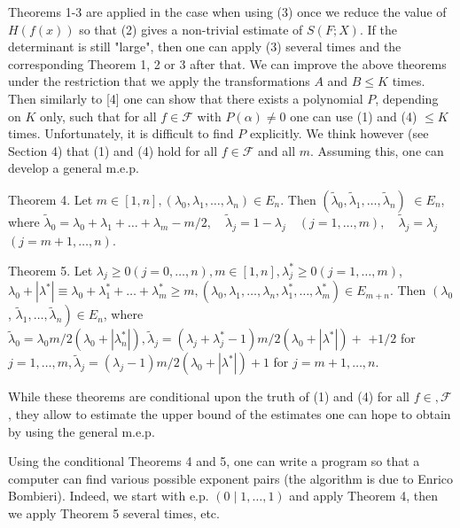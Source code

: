 \documentclass[10pt]{article}
\begin{document}
Theorems 1-3 are applied in the case when using (3) once we reduce the value of $H(f(x))$ so that (2) gives a non-trivial estimate of $S(F ; X)$. If the determinant is still "large", then one can apply (3) several times and the corresponding Theorem 1, 2 or 3 after that. We can improve the above theorems under the restriction that we apply the transformations $A$ and $B \leqslant K$ times. Then similarly to [4] one can show that there exists a polynomial $P$, depending on $K$ only, such that for all $f \in \mathscr{F}$ with $P(\alpha) \neq 0$ one can use (1) and (4) $\leqslant K$ times. Unfortunately, it is difficult to find $P$ explicitly. We think however (see Section 4) that (1) and (4) hold for all $f \in \mathscr{F}$ and all $m$. Assuming this, one can develop a general m.e.p.

Theorem 4. Let $m \in[1, n],\left(\lambda_{0}, \lambda_{1}, \ldots, \lambda_{n}\right) \in E_{n}$. Then $\left(\tilde{\lambda}_{0}, \tilde{\lambda}_{1}, \ldots, \tilde{\lambda}_{n}\right)$ $\in E_{n}$, where $\tilde{\lambda}_{0}=\lambda_{0}+\lambda_{1}+\ldots+\lambda_{m}-m / 2, \quad \tilde{\lambda}_{j}=1-\lambda_{j} \quad(j=1, \ldots, m), \quad \tilde{\lambda}_{j}=\lambda_{j}$ $(j=m+1, \ldots, n)$.

Theorem 5. Let $\lambda_{j} \geqslant 0(j=0, \ldots, n), m \in[1, n], \lambda_{j}^{*} \geqslant 0(j=1, \ldots, m)$, $\lambda_{0}+\left|\lambda^{*}\right| \equiv \lambda_{0}+\lambda_{1}^{*}+\ldots+\lambda_{m}^{*} \geqslant m,\left(\lambda_{0}, \lambda_{1}, \ldots, \lambda_{n}, \lambda_{1}^{*}, \ldots, \lambda_{m}^{*}\right) \in E_{m+n}$. Then $\left(\lambda_{0}\right.$, $\left.\tilde{\lambda}_{1}, \ldots, \tilde{\lambda}_{n}\right) \in E_{n}$, where $\tilde{\lambda}_{0}=\lambda_{0} m / 2\left(\lambda_{0}+\left|\lambda_{n}^{*}\right|\right), \tilde{\lambda}_{j}=\left(\lambda_{j}+\lambda_{j}^{*}-1\right) m / 2\left(\lambda_{0}+\left|\lambda^{*}\right|\right)+$ $+1 / 2$ for $j=1, \ldots, m, \tilde{\lambda}_{j}=\left(\lambda_{j}-1\right) m / 2\left(\lambda_{0}+\left|\lambda^{*}\right|\right)+1$ for $j=m+1, \ldots, n$.

While these theorems are conditional upon the truth of (1) and (4) for all $f \in, \mathscr{F}$, they allow to estimate the upper bound of the estimates one can hope to obtain by using the general m.e.p.

Using the conditional Theorems 4 and 5, one can write a program so that a computer can find various possible exponent pairs (the algorithm is due to Enrico Bombieri). Indeed, we start with e.p. $(0 \mid 1, \ldots, 1)$ and apply Theorem 4, then we apply Theorem 5 several times, etc.
\end{document}
